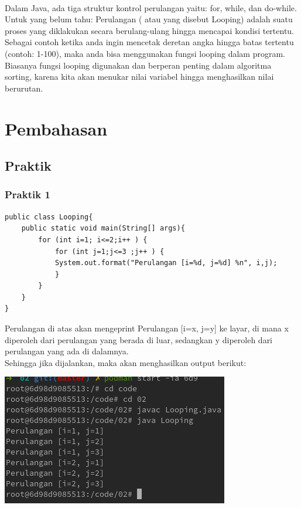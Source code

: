\documentclass[a4paper,12pt]{article}
\begin{document}
\paragraph{}
Dalam Java, ada tiga struktur kontrol perulangan yaitu: for, while, dan do-while.
Untuk yang belum tahu: Perulangan ( atau yang disebut Looping) adalah suatu
proses yang diklakukan secara berulang-ulang hingga mencapai kondisi tertentu.
Sebagai contoh ketika anda ingin mencetak deretan angka hingga batas tertentu
(contoh: 1-100), maka anda bisa menggunakan fungsi looping dalam program.
Biasanya fungsi looping digunakan dan berperan penting dalam algoritma
sorting, karena kita akan menukar nilai variabel hingga menghasilkan nilai
berurutan.

\newpage

\section{Pembahasan}
\subsection{Praktik}
\subsubsection{Praktik 1}
\begin{lstlisting}
public class Looping{
    public static void main(String[] args){
        for (int i=1; i<=2;i++ ) {
            for (int j=1;j<=3 ;j++ ) {
            System.out.format("Perulangan [i=%d, j=%d] %n", i,j);
            }
        }
    }
}
\end{lstlisting}
Perulangan di atas akan mengeprint Perulangan [i=x, j=y] ke layar, di mana x diperoleh dari perulangan yang berada di luar, sedangkan y diperoleh dari perulangan yang ada di dalamnya.\\
Sehingga jika dijalankan, maka akan menghasilkan output berikut:\\
\begin{center}
    \includegraphics[scale=.7]{1.png}
\end{center}
\end{document}
